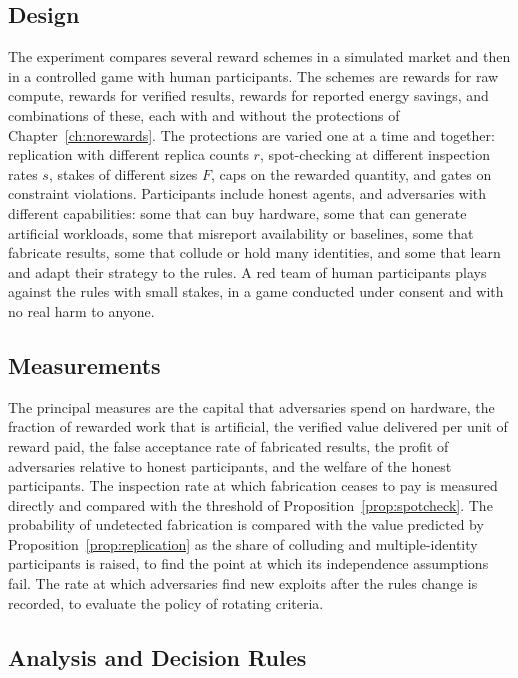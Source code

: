 \subsection*{Design}

The experiment compares several reward schemes in a simulated market and then in a controlled game with human participants. The schemes are rewards for raw compute, rewards for verified results, rewards for reported energy savings, and combinations of these, each with and without the protections of Chapter~\ref{ch:norewards}. The protections are varied one at a time and together: replication with different replica counts $r$, spot-checking at different inspection rates $s$, stakes of different sizes $F$, caps on the rewarded quantity, and gates on constraint violations. Participants include honest agents, and adversaries with different capabilities: some that can buy hardware, some that can generate artificial workloads, some that misreport availability or baselines, some that fabricate results, some that collude or hold many identities, and some that learn and adapt their strategy to the rules. A red team of human participants plays against the rules with small stakes, in a game conducted under consent and with no real harm to anyone.

\subsection*{Measurements}

The principal measures are the capital that adversaries spend on hardware, the fraction of rewarded work that is artificial, the verified value delivered per unit of reward paid, the false acceptance rate of fabricated results, the profit of adversaries relative to honest participants, and the welfare of the honest participants. The inspection rate at which fabrication ceases to pay is measured directly and compared with the threshold of Proposition~\ref{prop:spotcheck}. The probability of undetected fabrication is compared with the value predicted by Proposition~\ref{prop:replication} as the share of colluding and multiple-identity participants is raised, to find the point at which its independence assumptions fail. The rate at which adversaries find new exploits after the rules change is recorded, to evaluate the policy of rotating criteria.

\subsection*{Analysis and Decision Rules}

